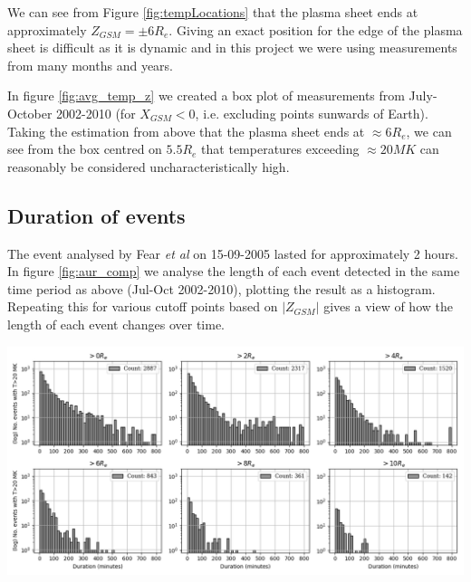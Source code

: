 \documentclass{article}
\newenvironment{Figure}
  {\par\medskip\noindent\minipage{\linewidth}}
  {\endminipage\par\medskip}
\begin{document}
We can see from Figure \ref{fig:tempLocations} that the plasma sheet ends at approximately $Z_{GSM}=\pm6R_e$. Giving an exact position for the edge of the plasma sheet is difficult as it is dynamic and in this project we were using measurements from many months and years.

In figure \ref{fig:avg_temp_z} we created a box plot of measurements from July-October 2002-2010 (for $X_{GSM} < 0$, i.e. excluding points sunwards of Earth). Taking the estimation from above that the plasma sheet ends at $\approx6R_e$, we can see from the box centred on $5.5R_e$ that temperatures exceeding $\approx 20MK$ can reasonably be considered uncharacteristically high.

\subsection{Duration of events}
The event analysed by Fear \textit{et al} \cite{Fear1506} on 15-09-2005 lasted for approximately 2 hours. In figure \ref{fig:aur_comp} we analyse the length of each event detected in the same time period as above (Jul-Oct 2002-2010), plotting the result as a histogram. Repeating this for various cutoff points based on $|Z_{GSM}|$ gives a view of how the length of each event changes over time. 

\begin{Figure}
    \centering
    \includegraphics[width=\textwidth]{aur_comp.png}
    \label{fig:aur_comp}
\end{Figure}
\end{document}
